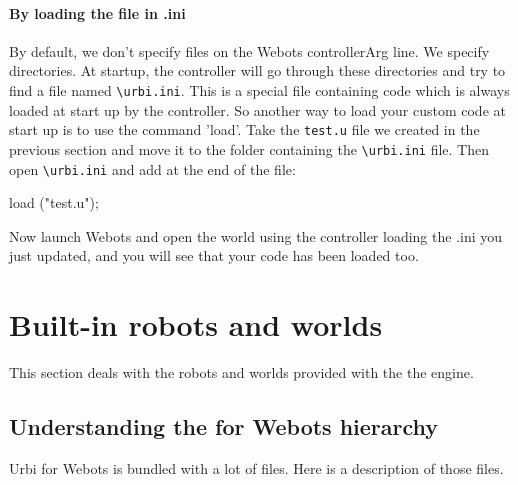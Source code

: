 \paragraph{By loading the file in \urbi.ini}
\label{webots.firstrun.loadprograms.inurbiinifile}

By default, we don't specify files on the Webots controllerArg
line. We specify directories.  At startup, the \urbi controller will go
through these directories and try to find a file named
\nolinkurl{\urbi.ini}. This is a special file containing \urbi code
which is always loaded at start up by the \urbi controller. So another
way to load your custom \urbi code at start up is to use the command
'load'.  Take the \nolinkurl{test.u} file we created in the previous
section and move it to the folder containing the \nolinkurl{\urbi.ini}
file. Then open \nolinkurl{\urbi.ini} and add at the end of the file:


\begin{urbifixme}
load ("test.u");
\end{urbifixme}
Now launch Webots and open the world using the \urbi controller loading
the \urbi.ini you just updated, and you will see that your code has
been loaded too.


\section{Built-{}in robots and worlds}
\label{webots.builtin}%

This section deals with the robots and worlds provided with the the
engine.


\subsection{Understanding the \urbi for Webots hierarchy}
\label{webots.builtin.hierarchy}%

 Urbi for Webots is bundled with a lot of files. Here is a description of
those files.

